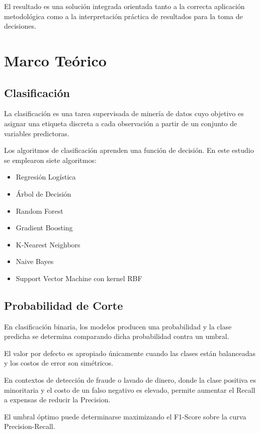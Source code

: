 \documentclass[12pt]{article}
\begin{document}
El resultado es una solución integrada orientada tanto a la correcta aplicación metodológica como a la interpretación práctica de resultados para la toma de decisiones.

\section{Marco Teórico}

\subsection{Clasificación}

La clasificación es una tarea supervisada de minería de datos cuyo objetivo es asignar una etiqueta discreta a cada observación a partir de un conjunto de variables predictoras.

Los algoritmos de clasificación aprenden una función de decisión. En este estudio se emplearon siete algoritmos:

\begin{itemize}
\item Regresión Logística
\item Árbol de Decisión
\item Random Forest
\item Gradient Boosting
\item K-Nearest Neighbors
\item Naive Bayes
\item Support Vector Machine con kernel RBF
\end{itemize}

\subsection{Probabilidad de Corte}

En clasificación binaria, los modelos producen una probabilidad y la clase predicha se determina comparando dicha probabilidad contra un umbral.

El valor por defecto es apropiado únicamente cuando las clases están balanceadas y los costos de error son simétricos.

En contextos de detección de fraude o lavado de dinero, donde la clase positiva es minoritaria y el costo de un falso negativo es elevado, permite aumentar el Recall a expensas de reducir la Precision.

El umbral óptimo puede determinarse maximizando el F1-Score sobre la curva Precision-Recall.
\end{document}
